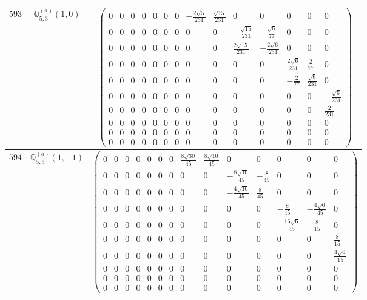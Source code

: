 \documentclass[fleqn,8pt,landscape]{jsarticle}
\begin{document}
\begin{center}
\begin{longtable}{ccc}
$ 593 $ & $ \mathbb{Q}_{5,3}^{(a)}(1,0) $ & $ \begin{pmatrix} 0 & 0 & 0 & 0 & 0 & 0 & 0 & - \frac{2 \sqrt{5}}{231} & \frac{\sqrt{15}}{231} & 0 & 0 & 0 & 0 & 0 \\ 0 & 0 & 0 & 0 & 0 & 0 & 0 & 0 & 0 & - \frac{\sqrt{15}}{231} & - \frac{\sqrt{6}}{77} & 0 & 0 & 0 \\ 0 & 0 & 0 & 0 & 0 & 0 & 0 & 0 & 0 & \frac{2 \sqrt{15}}{231} & - \frac{2 \sqrt{6}}{231} & 0 & 0 & 0 \\ 0 & 0 & 0 & 0 & 0 & 0 & 0 & 0 & 0 & 0 & 0 & \frac{2 \sqrt{6}}{231} & \frac{2}{77} & 0 \\ 0 & 0 & 0 & 0 & 0 & 0 & 0 & 0 & 0 & 0 & 0 & - \frac{2}{77} & \frac{\sqrt{6}}{231} & 0 \\ 0 & 0 & 0 & 0 & 0 & 0 & 0 & 0 & 0 & 0 & 0 & 0 & 0 & - \frac{\sqrt{6}}{231} \\ 0 & 0 & 0 & 0 & 0 & 0 & 0 & 0 & 0 & 0 & 0 & 0 & 0 & \frac{2}{231} \\ 0 & 0 & 0 & 0 & 0 & 0 & 0 & 0 & 0 & 0 & 0 & 0 & 0 & 0 \\ 0 & 0 & 0 & 0 & 0 & 0 & 0 & 0 & 0 & 0 & 0 & 0 & 0 & 0 \\ 0 & 0 & 0 & 0 & 0 & 0 & 0 & 0 & 0 & 0 & 0 & 0 & 0 & 0 \end{pmatrix} $ \\ \hline
$ 594 $ & $ \mathbb{Q}_{5,3}^{(a)}(1,-1) $ & $ \begin{pmatrix} 0 & 0 & 0 & 0 & 0 & 0 & 0 & \frac{8 \sqrt{30}}{45} & \frac{8 \sqrt{10}}{45} & 0 & 0 & 0 & 0 & 0 \\ 0 & 0 & 0 & 0 & 0 & 0 & 0 & 0 & 0 & - \frac{8 \sqrt{10}}{45} & - \frac{8}{45} & 0 & 0 & 0 \\ 0 & 0 & 0 & 0 & 0 & 0 & 0 & 0 & 0 & - \frac{4 \sqrt{10}}{45} & \frac{8}{45} & 0 & 0 & 0 \\ 0 & 0 & 0 & 0 & 0 & 0 & 0 & 0 & 0 & 0 & 0 & - \frac{8}{45} & - \frac{4 \sqrt{6}}{45} & 0 \\ 0 & 0 & 0 & 0 & 0 & 0 & 0 & 0 & 0 & 0 & 0 & - \frac{16 \sqrt{6}}{45} & - \frac{8}{15} & 0 \\ 0 & 0 & 0 & 0 & 0 & 0 & 0 & 0 & 0 & 0 & 0 & 0 & 0 & \frac{8}{15} \\ 0 & 0 & 0 & 0 & 0 & 0 & 0 & 0 & 0 & 0 & 0 & 0 & 0 & \frac{4 \sqrt{6}}{15} \\ 0 & 0 & 0 & 0 & 0 & 0 & 0 & 0 & 0 & 0 & 0 & 0 & 0 & 0 \\ 0 & 0 & 0 & 0 & 0 & 0 & 0 & 0 & 0 & 0 & 0 & 0 & 0 & 0 \\ 0 & 0 & 0 & 0 & 0 & 0 & 0 & 0 & 0 & 0 & 0 & 0 & 0 & 0 \end{pmatrix} $ \\ \hline

\end{longtable}
\end{center}
\end{document}
